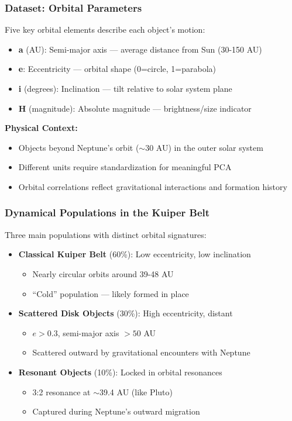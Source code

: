 \documentclass[aspectratio=169]{beamer}
\begin{document}
\begin{frame}
    \frametitle{Dataset: Orbital Parameters}
    Five key orbital elements describe each object's motion:
    \begin{itemize}
        \item \textbf{a} (AU): Semi-major axis — average distance from Sun (30-150 AU) \pause
        \item \textbf{e}: Eccentricity — orbital shape (0=circle, 1=parabola) \pause
        \item \textbf{i} (degrees): Inclination — tilt relative to solar system plane \pause
        \item \textbf{H} (magnitude): Absolute magnitude — brightness/size indicator \pause
    \end{itemize}
    \vspace{12pt}
    \textbf{Physical Context:}
    \begin{itemize}
        \item Objects beyond Neptune's orbit ($\sim$30 AU) in the outer solar system \pause
        \item Different units require standardization for meaningful PCA \pause
        \item Orbital correlations reflect gravitational interactions and formation history \pause
    \end{itemize}
\end{frame}

\begin{frame}
    \frametitle{Dynamical Populations in the Kuiper Belt}
    Three main populations with distinct orbital signatures:
    \begin{itemize}
        \item \textbf{Classical Kuiper Belt} (60\%): Low eccentricity, low inclination \pause
              \begin{itemize}
                  \item Nearly circular orbits around 39-48 AU \pause
                  \item ``Cold'' population — likely formed in place \pause
              \end{itemize}
        \item \textbf{Scattered Disk Objects} (30\%): High eccentricity, distant \pause
              \begin{itemize}
                  \item $e > 0.3$, semi-major axis $> 50$ AU \pause
                  \item Scattered outward by gravitational encounters with Neptune \pause
              \end{itemize}
        \item \textbf{Resonant Objects} (10\%): Locked in orbital resonances \pause
              \begin{itemize}
                  \item 3:2 resonance at $\sim$39.4 AU (like Pluto) \pause
                  \item Captured during Neptune's outward migration \pause
              \end{itemize}
    \end{itemize}
\end{frame}
\end{document}
